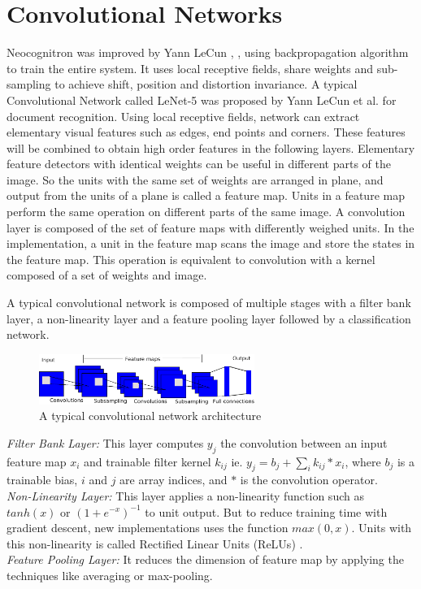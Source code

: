 \documentclass{article}
\begin{document}
\section{Convolutional Networks}
\par Neocognitron was improved by  Yann LeCun \cite{lecun-86}, \cite{lecun-89e}, using backpropagation algorithm  to train the entire system. It uses local receptive fields, share weights and  sub-sampling to achieve  shift, position and distortion invariance. A typical Convolutional Network called  LeNet-5 was proposed by   Yann LeCun et al. \cite{LeCun1998}  for document recognition. Using \allowbreak local receptive fields, network can extract elementary visual features such as edges, end points and corners. These features will be combined to obtain high order features in the following layers. Elementary feature detectors with identical weights can be useful in different parts of the image. So the units with  the same set of weights are arranged in plane, and output from  the units of a plane is called  a feature map. Units in  a feature map perform the same operation on different parts of the same image. A convolution layer is composed of the set of feature maps with differently weighed units. In the implementation, a unit in the feature map scans the image and store the states in the feature map. This operation is equivalent to convolution with a kernel composed of a  set of weights and image. 

\par
A typical convolutional  network is composed of multiple stages with a filter bank layer, a non-linearity layer and a feature pooling layer \cite{lecun2010convolutional} followed by a classification network.\\
\begin{figure}[ht]

 \includegraphics[width=7cm]{Figures/convent.eps}
\caption{A typical convolutional network architecture }
\label{net}
\end{figure}
\emph{Filter Bank Layer:} This layer computes $y_{j}$ the convolution between an input feature map   $x_i$ and trainable filter kernel $k_{ij}$ 
 ie. $y_j=b_j+\sum_i {k_{ij}*x_i}$, where $b_j$ is a trainable bias, $i$ and $j$ are  array indices, and $*$ is the convolution operator.\\
\emph{Non-Linearity Layer:} This layer applies a non-linearity function such as $tanh(x)$ or $(1+e^{-x})^{-1}$ to unit output. But to reduce training time with gradient descent, new implementations uses the function $max(0,x)$. Units with this non-linearity is called Rectified Linear Units (ReLUs) \cite{Nair2010}.\\
\emph{Feature Pooling Layer:} It  reduces the dimension of  feature map by applying the techniques like averaging or max-pooling.
\end{document}
